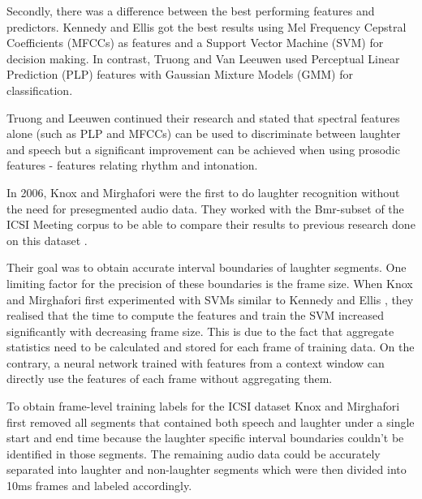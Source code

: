 \documentclass[bsc,frontabs,parskip,deptreport]{infthesis}
\begin{document}
Secondly, there was a difference between the best performing features and predictors.  
Kennedy and Ellis \citep{kennedy2004laughter} got the best results using Mel Frequency Cepstral Coefficients (MFCCs) as features and a Support Vector Machine (SVM) for decision making. 
In contrast, Truong and Van Leeuwen \citep{truong2005automatic} used Perceptual Linear Prediction (PLP) features with Gaussian Mixture Models (GMM) for classification. 

Truong and Leeuwen \citep{truong2007automatic} continued their research and stated that spectral features alone (such as PLP and MFCCs) can be used to discriminate between laughter and speech but a significant improvement can be achieved when using prosodic features - features relating rhythm and intonation.

In 2006, Knox and Mirghafori \citep{knox2006automatic} were the first to do laughter recognition without the need for presegmented audio data.  
They worked with the Bmr-subset of the ICSI Meeting corpus \citep{morgan2001meeting} to be able to compare their results to previous research done on this dataset \citep{kennedy2004laughter, truong2005automatic, truong2007automatic}.

Their goal was to obtain accurate interval boundaries of laughter segments.
One limiting factor for the precision of these boundaries is the frame size. 
When Knox and Mirghafori first experimented with SVMs similar to Kennedy and Ellis \citep{kennedy2004laughter}, they realised that the time to compute the features and train the SVM increased significantly with decreasing frame size. 
This is due to the fact that aggregate statistics need to be calculated and stored for each frame of training data.  
On the contrary, a neural network trained with features from a context window can directly use the features of each frame without aggregating them.  

To obtain frame-level training labels for the ICSI dataset Knox and Mirghafori first removed all segments that contained both speech and laughter under a single start and end time because the laughter specific interval boundaries couldn't be identified in those segments. 
The remaining audio data could be accurately separated into laughter and non-laughter segments which were then divided into 10ms frames and labeled accordingly.
\end{document}
